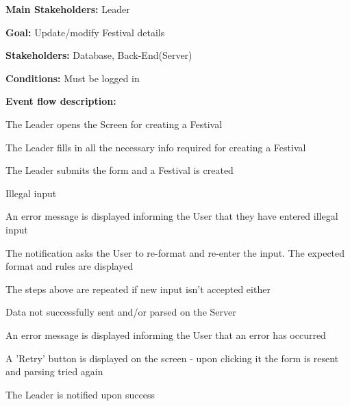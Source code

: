 				\noindent {}
				\begin{packed_item}
					\item \textbf{Main Stakeholders:} Leader
					\item \textbf{Goal:} Update/modify Festival details
					\item \textbf{Stakeholders: } Database, Back-End(Server)
					\item \textbf{Conditions: } Must be logged in
					\item \textbf{Event flow description: }
					\begin{packed_enum}
						\item The Leader opens the Screen for creating a Festival
						\item The Leader fills in all the necessary info required for creating a Festival
						\item The Leader submits the form and a Festival is created
					\end{packed_enum}
					
					\begin{packed_item}
						\item[2.a] Illegal input
						\item[] \begin{packed_enum}
							\item An error message is displayed informing the User that they have entered illegal input
							\item The notification asks the User to re-format and re-enter the input. The expected format and rules are displayed
							\item The steps above are repeated if new input isn't accepted either
						\end{packed_enum}
						
						\item[3.a] Data not successfully sent and/or parsed on the Server
						\item[] \begin{packed_enum}
							\item An error message is displayed informing the User that an error has occurred
							\item A 'Retry' button is displayed on the screen - upon clicking it the form is resent and parsing tried again
							\item The Leader is notified upon success
						\end{packed_enum}
						
					\end{packed_item}
				\end{packed_item}
			
